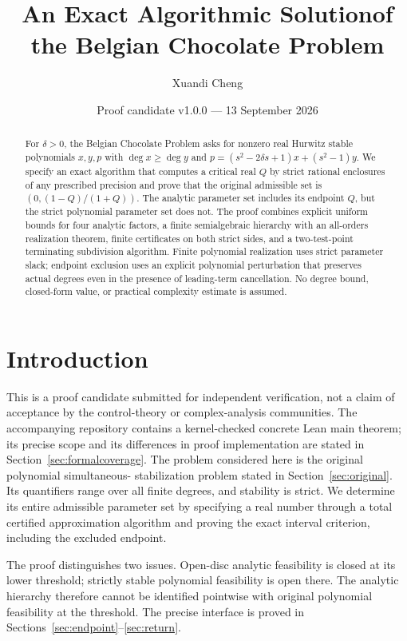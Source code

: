 \documentclass[11pt,a4paper]{article}
\title{\color{inkblue}An Exact Algorithmic Solution\newline of the Belgian Chocolate Problem}
\author{Xuandi Cheng}\date{Proof candidate v1.0.0 --- 13 September 2026}
\theoremstyle{definition}\newtheorem{definition}[theorem]{Definition}
\theoremstyle{remark}\newtheorem{remark}[theorem]{Remark}
\begin{document}
\maketitle
\begin{abstract}
For $\delta>0$, the Belgian Chocolate Problem asks for nonzero real Hurwitz
stable polynomials $x,y,p$ with $\deg x\geq\deg y$ and
$p=(s^2-2\delta s+1)x+(s^2-1)y$. We specify an exact algorithm that
computes a critical real $Q$ by strict rational enclosures of any prescribed
precision and prove that the original admissible set is
$(0,(1-Q)/(1+Q))$. The analytic parameter set includes its endpoint $Q$,
but the strict polynomial parameter set does not. The proof combines
explicit uniform bounds for four analytic factors, a finite semialgebraic
hierarchy with an all-orders realization theorem, finite certificates on
both strict sides, and a two-test-point terminating subdivision algorithm.
Finite polynomial realization uses strict parameter slack; endpoint
exclusion uses an explicit polynomial perturbation that preserves actual
degrees even in the presence of leading-term cancellation. No degree bound,
closed-form value, or practical complexity estimate is assumed.
\end{abstract}

\section{Introduction}
This is a proof candidate submitted for independent verification, not a claim
of acceptance by the control-theory or complex-analysis communities.
The accompanying repository contains a kernel-checked concrete Lean main theorem;
its precise scope and its differences in proof implementation are stated in
Section~\ref{sec:formalcoverage}.
The problem considered here is the original polynomial simultaneous-
stabilization problem stated in Section~\ref{sec:original}. Its quantifiers
range over all finite degrees, and stability is strict. We determine its
entire admissible parameter set by specifying a real number through a
total certified approximation algorithm and proving the exact interval
criterion, including the excluded endpoint.

The proof distinguishes two issues. Open-disc analytic feasibility is
closed at its lower threshold; strictly stable polynomial feasibility is
open there. The analytic hierarchy therefore cannot be identified
pointwise with original polynomial feasibility at the threshold. The
precise interface is proved in Sections~\ref{sec:endpoint}--\ref{sec:return}.
\end{document}
